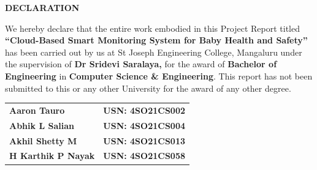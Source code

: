 \documentclass[12pt,a4paper]{report}
\begin{document}
\begin{center}
    {\Large \textbf{DECLARATION}}
\end{center}
\justifying
\par
{}
\noindent We hereby declare that the entire work embodied in this Project Report titled
\textbf{``Cloud-Based Smart Monitoring System for Baby Health and Safety''} has been carried out by us at St Joseph Engineering College, Mangaluru under the supervision of \textbf{Dr Sridevi Saralaya,} for the award of \textbf{Bachelor of Engineering} in \textbf{Computer Science \& Engineering}. This report has not been submitted to this or any other University  for the award of any  other degree. \\
\vspace{0.25in}


\begin{flushleft}
\begin{tabular}{l l}
\textbf{Aaron Tauro}         & \textbf{USN: 4SO21CS002} \\
\textbf{Abhik L Salian}      & \textbf{USN: 4SO21CS004} \\
\textbf{Akhil Shetty M}      & \textbf{USN: 4SO21CS013} \\
\textbf{H Karthik P Nayak}   & \textbf{USN: 4SO21CS058} \\
\end{tabular}
\end{flushleft}


{}
\end{document}
